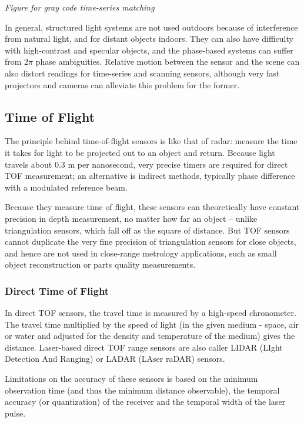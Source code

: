 \documentclass[twocolumn,oneside]{book}
\begin{document}
{\em Figure for gray code time-series matching}

In general, structured light systems are not used outdoors because of
interference from natural light, and for distant objects indoors.
They can also have difficulty with high-contrast and specular objects,
and the phase-based systems can suffer from $2\pi$ phase ambiguities.
Relative motion between the sensor and the scene can also distort
readings for time-series and scanning sensors, although very fast
projectors and cameras can alleviate this problem for the former.

\subsection{Time of Flight}

The principle behind time-of-flight sensors is like that of radar:
measure the time it takes for light to be projected out to an object
and return.  Because light travels about 0.3 m per nanosecond, very
precise timers are required for direct TOF measurement; an
alternative is indirect methods, typically phase difference with a
modulated reference beam.

Because they measure time of flight, these sensors can theoretically
have constant precision in depth measurement, no matter how far an
object -- unlike triangulation sensors, which fall off as the square of
distance.  But TOF sensors cannot duplicate the very fine precision of
triangulation sensors for close objects, and hence are not used in
close-range metrology applications, such as small object
reconstruction or parts quality measurements.

\subsubsection{Direct Time of Flight}
In direct TOF sensors, the travel time is measured by a high-speed
chronometer.  The travel time multiplied by the speed of light (in the
given medium - space, air or water and adjusted for the density and
temperature of the medium) gives the distance.  Laser-based direct TOF
range sensors are also caller LIDAR (LIght Detection And Ranging) or
LADAR (LAser raDAR) sensors.

Limitations on the accuracy of these sensors is based on the minimum 
observation time (and thus the minimum distance observable),
the temporal accuracy (or quantization) of the receiver and the temporal
width of the laser pulse.
\end{document}
